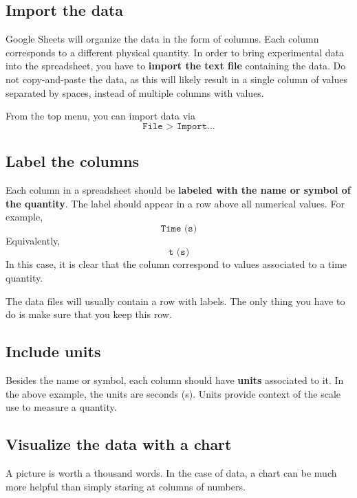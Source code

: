 \subsection{Import the data}
Google Sheets will organize the data in the form of columns. Each column corresponds to a different physical quantity. In order to bring experimental data into the spreadsheet, you have to \textbf{import the text file} containing the data. Do not copy-and-paste the data, as this will likely result in a single column of values separated by spaces, instead of multiple columns with values.

From the top menu, you can import data via
\begin{equation}
    \texttt{File > Import...}
\end{equation}
\subsection{Label the columns}
Each column in a spreadsheet should be \textbf{labeled with the name or symbol of the quantity}. The label should appear in a row above all numerical values. For example,
\begin{equation}
    \texttt{Time (s)}
\end{equation}
Equivalently,
\begin{equation}
    \texttt{t (s)}
\end{equation}
In this case, it is clear that the column correspond to values associated to a time quantity.

The data files will usually contain a row with labels. The only thing you have to do is make sure that you keep this row.
\subsection{Include units}
Besides the name or symbol, each column should have \textbf{units} associated to it. In the above example, the units are seconds (s). Units provide context of the scale use to measure a quantity.
\subsection{Visualize the data with a chart}
A picture is worth a thousand words. In the case of data, a chart can be much more helpful than simply staring at columns of numbers.

